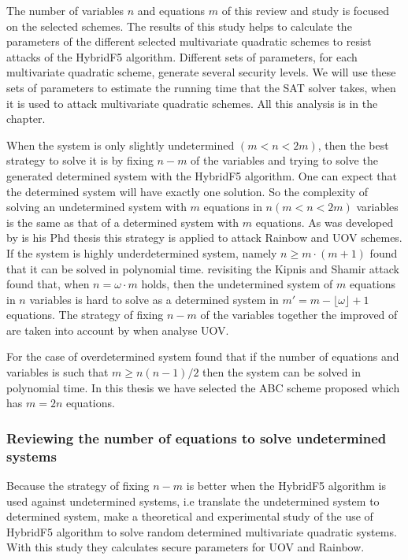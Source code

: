 The number of variables $n$ and equations $m$ of this review and study is focused on the selected schemes. The results of this study helps to calculate the parameters of the different selected multivariate quadratic schemes to resist attacks of the HybridF5 algorithm. Different sets of parameters, for each multivariate quadratic scheme, generate several security levels. We will use these sets of parameters to estimate the running time that the SAT solver takes, when it is used to attack multivariate quadratic schemes. All this analysis is in the chapter.

When the system is only slightly undetermined $(m<n<2m)$, then the best strategy to solve it is by fixing $n-m$ of the variables and trying to solve the generated determined system with the HybridF5 algorithm. One can expect that the determined system will have exactly one solution. So the complexity of solving an undetermined system with $m$ equations in $n (m<n<2m)$ variables is the same as that of a determined system with $m$ equations. As was developed by \cite{AlbrechtPetzoldt2013} is his Phd thesis this strategy is applied to attack Rainbow and UOV schemes.
If the system is highly underdetermined system, namely $n\geq m\cdot(m+1)$ \cite{Kipnis1999} found that it can be solved in polynomial time. \cite{Thomae2012} revisiting the Kipnis and Shamir attack found that, when $n = \omega \cdot m$ holds, then the undetermined system of $m$ equations in $n$ variables is hard to solve as a determined system in $m' = m - \lfloor{\omega\rfloor} + 1$ equations. The strategy of fixing $n-m$ of the variables together the improved of \cite{Thomae2012} are taken into account by \cite{AlbrechtPetzoldt2013} when analyse UOV.

For the case of overdetermined system \cite{Kipnis1999} found that if the number of equations and variables is such that $m \geq n(n - 1)/2$ then the system can be solved in polynomial time. In this thesis we have selected the ABC scheme proposed \citep{Tao2013} which has $m=2n$ equations.

\subsubsection{Reviewing the number of equations to solve undetermined systems}

Because the strategy of fixing $n-m$ is better when the HybridF5 algorithm is used against undetermined systems, i.e translate the undetermined system to determined system, \citet{AlbrechtPetzoldt2013} make a theoretical and experimental study of the use of HybridF5 algorithm to solve random determined multivariate quadratic systems. With this study they calculates secure parameters for UOV and Rainbow.

